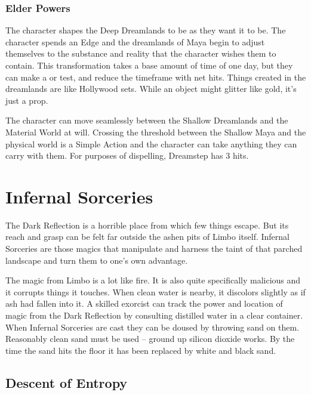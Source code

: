 \subsubsection{Elder Powers}

 The character shapes the Deep Dreamlands to be as they want it to be. The character spends an Edge and the dreamlands of Maya begin to adjust themselves to the substance and reality that the character wishes them to contain. This transformation takes a base amount of time of one day, but they can make a  or  test, and reduce the timeframe with net hits. Things created in the dreamlands are like Hollywood sets. While an object might glitter like gold, it's just a prop.

 The character can move seamlessly between the Shallow Dreamlands and the Material World at will. Crossing the threshold between the Shallow Maya and the physical world is a Simple Action and the character can take anything they can carry with them. For purposes of dispelling, Dreamstep has 3 hits.


\section{Infernal Sorceries}

\hspace{\parindent} The Dark Reflection is a horrible place from which few things escape. But its reach and grasp can be felt far outside the ashen pits of Limbo itself. Infernal Sorceries are those magics that manipulate and harness the taint of that parched landscape and turn them to one's own advantage.

The magic from Limbo is a lot like fire. It is also quite specifically malicious and it corrupts things it touches. When clean water is nearby, it discolors slightly as if ash had fallen into it. A skilled exorcist can track the power and location of magic from the Dark Reflection by consulting distilled water in a clear container. When Infernal Sorceries are cast they can be doused by throwing sand on them. Reasonably clean sand must be used -- ground up silicon dioxide works. By the time the sand hits the floor it has been replaced by white and black sand.

\subsection{Descent of Entropy}

